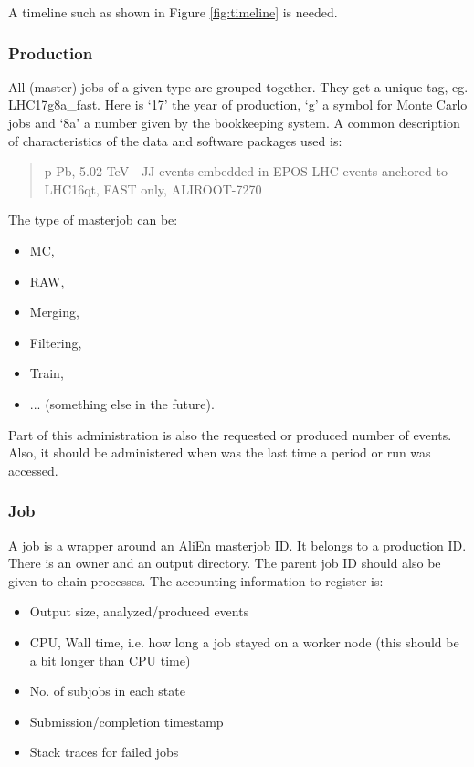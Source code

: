 A timeline such as shown in Figure \ref{fig:timeline} is needed.

\subsubsection{Production}
All (master) jobs of a given type are grouped together. They get a unique tag, eg. LHC17g8a\_fast. Here is `17' the year of production, `g' a symbol for Monte Carlo jobs and `8a' a number given by the bookkeeping system. A common description of characteristics of the data and software packages used is:
\begin{quotation}
p-Pb, 5.02 TeV - JJ events embedded in EPOS-LHC events anchored to LHC16qt, FAST only, ALIROOT-7270
\end{quotation}
The type of masterjob can be:
\begin{itemize}
  \item MC,
  \item RAW, 
  \item Merging, 
  \item Filtering, 
  \item Train, 
  \item ... (something else in the future).
\end{itemize}
Part of this administration is also the requested or produced number of events. Also, it should be administered when was the last time a period or run was accessed.

\subsubsection{Job}

A job is a wrapper around an AliEn masterjob ID. It belongs to a production ID. There is an owner and an output directory. The parent job ID should also be given to chain processes. The accounting information to register is:
\begin{itemize}
  \item Output size, analyzed/produced events
  \item CPU, Wall time, i.e. how long a job stayed on a worker node (this should be a bit longer than CPU time)
  \item No. of subjobs in each state
  \item Submission/completion timestamp
  \item Stack traces for failed jobs
\end{itemize}


